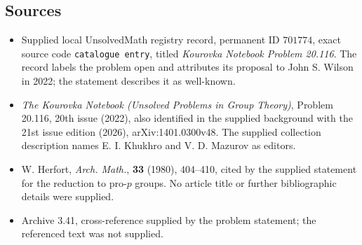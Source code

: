 \documentclass[11pt]{article}
\begin{document}
\subsection{Sources}
\begin{itemize}
\item Supplied local UnsolvedMath registry record, permanent ID \(701774\), exact source code \texttt{catalogue entry}, titled \emph{Kourovka Notebook Problem 20.116}. The record labels the problem open and attributes its proposal to John S. Wilson in 2022; the statement describes it as well-known.
\item \emph{The Kourovka Notebook (Unsolved Problems in Group Theory)}, Problem 20.116, 20th issue (2022), also identified in the supplied background with the 21st issue edition (2026), arXiv:1401.0300v48. The supplied collection description names E. I. Khukhro and V. D. Mazurov as editors.
\item W. Herfort, \emph{Arch. Math.}, \textbf{33} (1980), 404--410, cited by the supplied statement for the reduction to pro-\(p\) groups. No article title or further bibliographic details were supplied.
\item Archive 3.41, cross-reference supplied by the problem statement; the referenced text was not supplied.
\end{itemize}
\end{document}

